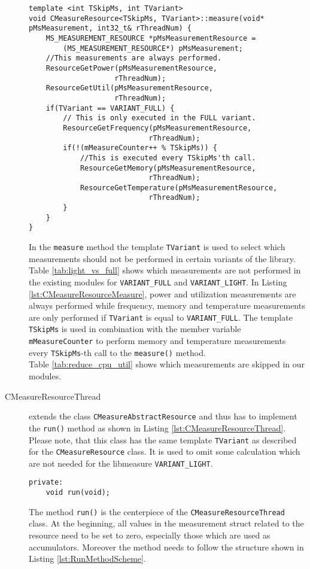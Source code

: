 \begin{description}
	\begin{lstlisting}[caption={Abstract minimal example for the \texttt{measure()} method of the \texttt{CMeasureResource} class to show the usage of the templates. \added[id=ck]{Listing aktualisiert}}, label=lst:CMeasureResourceMeasure]
template <int TSkipMs, int TVariant>
void CMeasureResource<TSkipMs, TVariant>::measure(void* pMsMeasurement, int32_t& rThreadNum) {
	MS_MEASUREMENT_RESOURCE *pMsMeasurementResource =
		(MS_MEASUREMENT_RESOURCE*) pMsMeasurement;
	//This measurements are always performed.
	ResourceGetPower(pMsMeasurementResource,
					rThreadNum);
	ResourceGetUtil(pMsMeasurementResource,
					rThreadNum);
	if(TVariant == VARIANT_FULL) {
		// This is only executed in the FULL variant.
		ResourceGetFrequency(pMsMeasurementResource,
							rThreadNum);
		if(!(mMeasureCounter++ % TSkipMs)) {
			//This is executed every TSkipMs'th call. 
			ResourceGetMemory(pMsMeasurementResource,
							rThreadNum);
			ResourceGetTemperature(pMsMeasurementResource,
							rThreadNum);
		}
	}
}	
	\end{lstlisting}
	In the \texttt{measure} method the template \texttt{TVariant} is used to select which measurements should not be performed in certain variants of the library. Table \ref{tab:light_vs_full} shows which measurements are not performed in the existing modules for \texttt{VARIANT\_FULL} and \texttt{VARIANT\_LIGHT}. In Listing \ref{lst:CMeasureResourceMeasure}, power and utilization measurements are always performed while frequency, memory and temperature measurements are only performed if \texttt{TVariant} is equal to \texttt{VARIANT\_FULL}. 
	The template \texttt{TSkipMs} is used in combination with the member variable \texttt{mMeasureCounter} to perform memory and temperature measurements every \texttt{TSkipMs}-th call to the \texttt{measure()} method.\\Table \ref{tab:reduce_cpu_util} shows which measurements are skipped in our modules.
		 
	\item[CMeasureResourceThread] extends the class \texttt{CMeasureAbstractResource} and thus has to implement the \texttt{run()} method as shown in Listing \ref{lst:CMeasureResourceThread}. Please note, that this class has the same template \texttt{TVariant} as described for the \texttt{CMeasureResource} class. It is used to omit some calculation which are not needed for the libmeasure \texttt{VARIANT\_LIGHT}.
	\begin{lstlisting}[caption={Methods of the \texttt{CMeasureResourceThread} class that programmers have to implement in order to support a new resource.}, label=lst:CMeasureResourceThread]
private:
	void run(void);
	\end{lstlisting}
	The method \texttt{run()} is the centerpiece of the \texttt{CMeasureResourceThread} class. At the beginning, all values in the measurement struct related to the resource need to be set to zero, especially those which are used as accumulators. Moreover the method needs to follow the structure shown in Listing \ref{lst:RunMethodScheme}.
	

\end{description}
